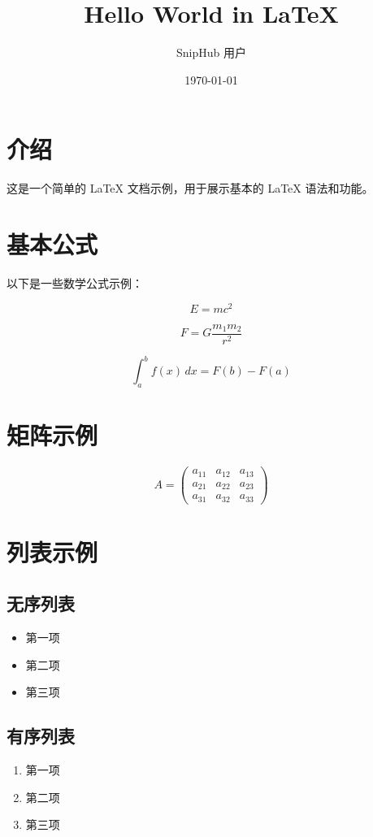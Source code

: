 \documentclass{article}
\title{Hello World in \LaTeX}
\author{SnipHub 用户}
\date{\today}
\begin{document}
\maketitle

\section{介绍}
这是一个简单的 \LaTeX{} 文档示例，用于展示基本的 \LaTeX{} 语法和功能。

\section{基本公式}
以下是一些数学公式示例：

\begin{equation}
E = mc^2
\end{equation}

\begin{equation}
F = G \frac{m_1 m_2}{r^2}
\end{equation}

\begin{equation}
\int_{a}^{b} f(x) \, dx = F(b) - F(a)
\end{equation}

\section{矩阵示例}
\begin{equation}
A = 
\begin{pmatrix}
a_{11} & a_{12} & a_{13} \\
a_{21} & a_{22} & a_{23} \\
a_{31} & a_{32} & a_{33}
\end{pmatrix}
\end{equation}

\section{列表示例}
\subsection{无序列表}
\begin{itemize}
  \item 第一项
  \item 第二项
  \item 第三项
\end{itemize}

\subsection{有序列表}
\begin{enumerate}
  \item 第一项
  \item 第二项
  \item 第三项
\end{enumerate}
\end{document}
